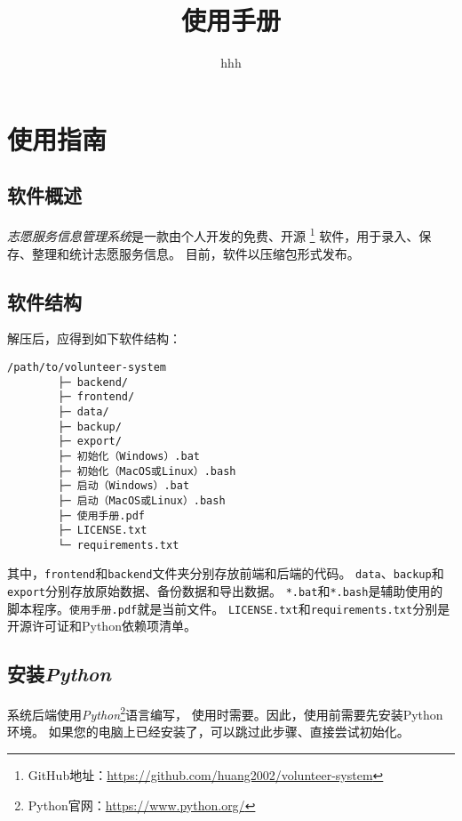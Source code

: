 \documentclass[12pt,titlepage]{article}
\title{\systemname\\使用手册\\\systemversion}
\author{hhh}
\newcommand{\systemname}{志愿服务信息管理系统}
\newcommand{\githuburl}{https://github.com/huang2002/volunteer-system}
\newcommand{\Python}{\textit{Python}}
\begin{document}
 \sloppy

\maketitle

\tableofcontents
\thispagestyle{empty}
\setcounter{page}{0}

\pagestyle{headings}

\newpage
\section{使用指南}

\subsection{软件概述}

\textit{\systemname}是一款由个人开发的免费、开源
\footnote{GitHub地址：\url{\githuburl}}
软件，用于录入、保存、整理和统计志愿服务信息。
目前，软件以压缩包形式发布。

\subsection{软件结构}

解压后，应得到如下软件结构：

\begin{verbatim}
/path/to/volunteer-system
        ├─ backend/
        ├─ frontend/
        ├─ data/
        ├─ backup/
        ├─ export/
        ├─ 初始化（Windows）.bat
        ├─ 初始化（MacOS或Linux）.bash
        ├─ 启动（Windows）.bat
        ├─ 启动（MacOS或Linux）.bash
        ├─ 使用手册.pdf
        ├─ LICENSE.txt
        └─ requirements.txt
\end{verbatim}

其中，\texttt{frontend}和\texttt{backend}文件夹分别存放前端和后端的代码。
\texttt{data}、\texttt{backup}和\texttt{export}分别存放原始数据、备份数据和导出数据。
\texttt{*.bat}和\texttt{*.bash}是辅助使用的脚本程序。\texttt{使用手册.pdf}就是当前文件。
\texttt{LICENSE.txt}和\texttt{requirements.txt}分别是开源许可证和Python依赖项清单。

\subsection{安装\Python}
\label{sec:install-python}

系统后端使用\Python\footnote{Python官网：\url{https://www.python.org/}}语言编写，
使用时需要。因此，使用前需要先安装Python环境。
如果您的电脑上已经安装了，可以跳过此步骤、直接尝试初始化。
\end{document}
